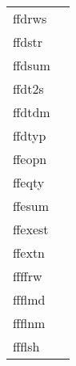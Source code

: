 \documentclass[11pt]{book}
\begin{document}
\begin{tabular}{lr}
ffdrws & \pageref{ffdrws} \\
ffdstr     & \pageref{ffdkey} \\
ffdsum  & \pageref{ffdsum} \\
ffdt2s  & \pageref{ffdt2s} \\
ffdtdm   & \pageref{ffdtdm} \\
ffdtyp    & \pageref{ffdtyp} \\
ffeopn    & \pageref{ffopen} \\
ffeqty    & \pageref{ffgtcl} \\
ffesum  & \pageref{ffesum} \\
ffexest  & \pageref{ffexist} \\
ffextn   & \pageref{ffextn} \\
ffffrw    & \pageref{ffffrw} \\
ffflmd      & \pageref{ffflmd} \\
ffflnm      & \pageref{ffflnm} \\
ffflsh     & \pageref{ffflus} \\
\end{tabular}
\end{document}
